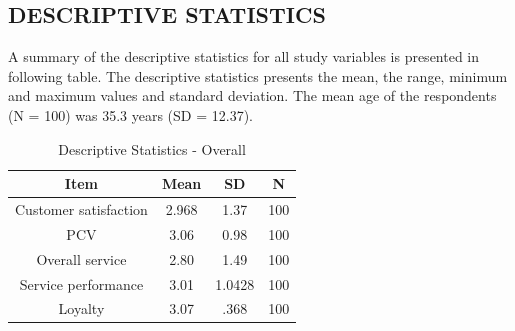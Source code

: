 \documentclass[a4paper, 12pt]{extarticle}
\begin{document}
{\subsection{DESCRIPTIVE STATISTICS}
A summary of the descriptive statistics for all study variables is presented in following table. The descriptive statistics presents the mean, the range, minimum and maximum values and standard deviation. The mean age of the respondents (N = 100) was 35.3 years (SD = 12.37). 

\begin{table}[H]
\centering
\begin{tabular}{|c|c|c|c|}
\hline
Item & \textbf{Mean} & \textbf{SD} & N \\
\hline
Customer satisfaction & 2.968 & 1.37 & 100 \\
\hline
PCV & 3.06 & 0.98 & 100 \\
\hline
Overall service & 2.80 & 1.49 & 100 \\
\hline
Service performance & 3.01 & 1.0428 & 100 \\
\hline
Loyalty & 3.07 & .368 & 100 \\
\hline
\end{tabular}
\caption{Descriptive Statistics - Overall}
\end{table} 

}
\end{document}
